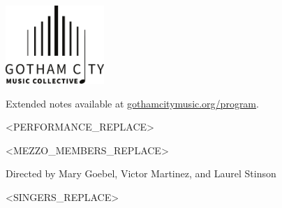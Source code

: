 \documentclass{article}[10pt]
\newcommand{\logo}{
        {\includegraphics[width=0.28\textwidth]{../graphic_design_assets/bw_logo_full}}
}
\newcommand{\tunespacefront}{\vspace{0.1in}}
\begin{document}
    \begin{center}

        \logo

        \tunespacefront

        {{}}

        {
            \footnotesize{
                Extended notes available at
                \href{https://gothamcitymusic.org/program}{gothamcitymusic.org/program}.
            }
        }

        \tunespacefront
        \tunespacefront

        \begin{minipage}{\textwidth}
            \begin{flushright}

                <PERFORMANCE_REPLACE>

            \end{flushright}

        \end{minipage}

        \tunespacefront
        \tunespacefront

        \textbf{}
        \vspace{-0.15in}
        \begin{multicols}{3}
            \begin{small}
                <MEZZO_MEMBERS_REPLACE>
            \end{small}
        \end{multicols}

        \textbf{}

        \begin{small}
            Directed by
            Mary Goebel,
            Victor Martinez,
            and
            Laurel Stinson\\
        \end{small}

        \vspace{-0.1in}
        \begin{multicols}{3}
            \begin{center}
                \begin{small}
                    <SINGERS_REPLACE>
                \end{small}
            \end{center}
        \end{multicols}


\end{center}
\end{document}

